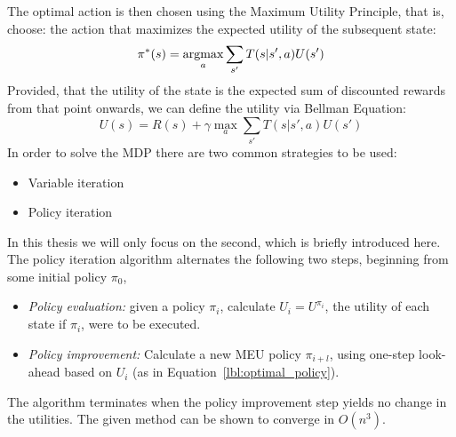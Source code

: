         The optimal action is then chosen using the Maximum Utility Principle, that is,
        choose: the action that maximizes the expected utility of the subsequent state:
        \begin{equation}
        \label{lbl:optimal_policy}
        \pi^*(s) = \mathop{\rm argmax}_a \sum_{s'} T(s| s', a)U(s')
        \end{equation}
        Provided, that the utility of the state is the expected sum of discounted
        rewards from that point onwards, we can define the utility via Bellman Equation:
        \begin{equation}
        \label{lbl:bellman_equation}
            U(s) = R(s) + \gamma \max_a \sum_{s'}T(s| s', a)U(s')
        \end{equation}
        In order to solve the MDP there are two common strategies to be used:
        \begin{itemize}
            \item Variable iteration
            \item Policy iteration
        \end{itemize}
        In this thesis we will only focus on the second, which is briefly introduced here. \\
        The policy iteration algorithm alternates the following two steps, beginning from some initial policy $\pi_0$,
        \begin{itemize}
            \item \emph{Policy evaluation:} given a policy $\pi_i$, calculate $U_i = U^{\pi_i}$, the utility of each state if $\pi_i$, were to be executed.
            \item \emph{Policy improvement:} Calculate a new MEU policy $\pi_{i+l}$, using one-step look-ahead based on $U_i$ (as in Equation~\ref{lbl:optimal_policy}).
        \end{itemize}
        The algorithm terminates when the policy improvement step yields no change in the utilities. The given method can be shown to converge in $O(n^3)$.



